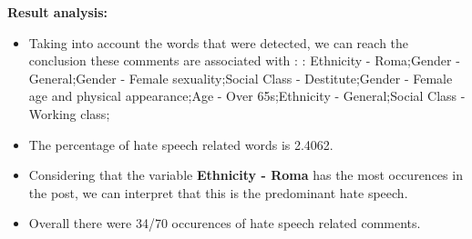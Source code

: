 \documentclass[11pt]{article}
\begin{document}
\textbf{\Large Result analysis:}

\begin{itemize}\item Taking into account the words that were detected, we can reach the conclusion these comments are associated with : : Ethnicity - Roma;Gender - General;Gender - Female sexuality;Social Class - Destitute;Gender - Female age and physical appearance;Age - Over 65s;Ethnicity - General;Social Class - Working class;%

\item The percentage of hate speech related words is 2.4062.

\item Considering that the variable \textbf{Ethnicity - Roma} has the most occurences in the post, we can interpret that this is the predominant hate speech.

\item Overall there were 34/70 occurences of hate speech related comments.\end{itemize}
\end{document}
